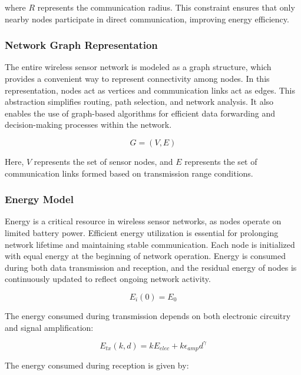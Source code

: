 \documentclass[a4paper,fleqn]{cas-dc}
\numberwithin{equation}{section}
\begin{document}
where $R$ represents the communication radius. This constraint ensures that only nearby nodes participate in direct communication, improving energy efficiency.

\subsubsection{Network Graph Representation}

The entire wireless sensor network is modeled as a graph structure, which provides a convenient way to represent connectivity among nodes. In this representation, nodes act as vertices and communication links act as edges. This abstraction simplifies routing, path selection, and network analysis. It also enables the use of graph-based algorithms for efficient data forwarding and decision-making processes within the network.

\begin{equation}
G = (V, E)
\label{eq:4.6}
\end{equation}

Here, $V$ represents the set of sensor nodes, and $E$ represents the set of communication links formed based on transmission range conditions.

\subsubsection{Energy Model}

Energy is a critical resource in wireless sensor networks, as nodes operate on limited battery power. Efficient energy utilization is essential for prolonging network lifetime and maintaining stable communication. Each node is initialized with equal energy at the beginning of network operation. Energy is consumed during both data transmission and reception, and the residual energy of nodes is continuously updated to reflect ongoing network activity.

\begin{equation}
E_i(0) = E_0
\label{eq:4.7}
\end{equation}

The energy consumed during transmission depends on both electronic circuitry and signal amplification:

\begin{equation}
E_{tx}(k,d) = kE_{elec} + k\epsilon_{amp} d^\gamma
\end{equation}

The energy consumed during reception is given by:
\end{document}
